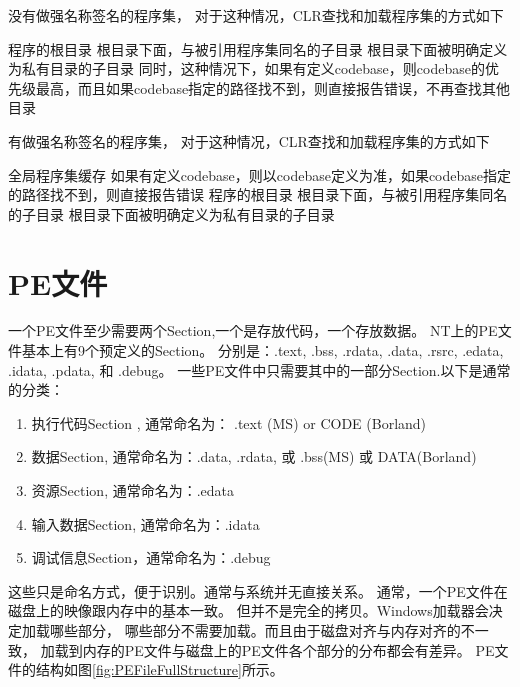 \documentclass{book}
\begin{document}
没有做强名称签名的程序集，
对于这种情况，CLR查找和加载程序集的方式如下

程序的根目录
根目录下面，与被引用程序集同名的子目录
根目录下面被明确定义为私有目录的子目录
同时，这种情况下，如果有定义codebase，则codebase的优先级最高，而且如果codebase指定的路径找不到，则直接报告错误，不再查找其他目录

有做强名称签名的程序集，
对于这种情况，CLR查找和加载程序集的方式如下

全局程序集缓存
如果有定义codebase，则以codebase定义为准，如果codebase指定的路径找不到，则直接报告错误
程序的根目录
根目录下面，与被引用程序集同名的子目录
根目录下面被明确定义为私有目录的子目录

\section{PE文件}

一个PE文件至少需要两个Section,一个是存放代码，一个存放数据。
NT上的PE文件基本上有9个预定义的Section。
分别是：.text, .bss, .rdata, .data, .rsrc, .edata, .idata, .pdata, 和 .debug。
一些PE文件中只需要其中的一部分Section.以下是通常的分类：

\begin{enumerate}
\setcounter{enumi}{0}
\item{执行代码Section , 通常命名为： .text (MS) or CODE (Borland)}
\item{数据Section, 通常命名为：.data, .rdata, 或 .bss(MS) 或 DATA(Borland)}
\item{资源Section, 通常命名为：.edata}
\item{输入数据Section, 通常命名为：.idata}
\item{调试信息Section，通常命名为：.debug}
\end{enumerate}

这些只是命名方式，便于识别。通常与系统并无直接关系。
通常，一个PE文件在磁盘上的映像跟内存中的基本一致。
但并不是完全的拷贝。Windows加载器会决定加载哪些部分，
哪些部分不需要加载。而且由于磁盘对齐与内存对齐的不一致，
加载到内存的PE文件与磁盘上的PE文件各个部分的分布都会有差异。
PE文件的结构如图\ref{fig:PEFileFullStructure}所示。
\end{document}
